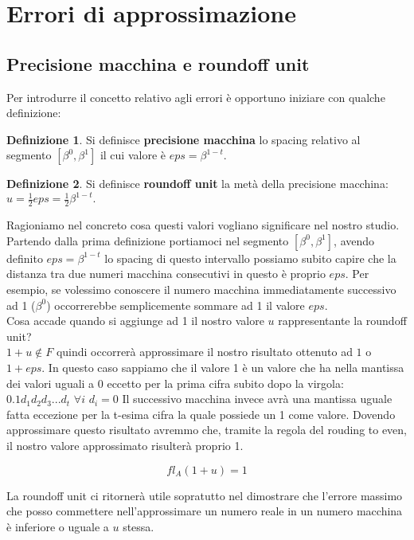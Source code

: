 \documentclass[12pt, a4paper]{book}
\theoremstyle{definition}
\newtheorem{defn}{Definizione}[section]
\begin{document}
\section{Errori di approssimazione}

\subsection{Precisione macchina e roundoff unit}
\begin{flushleft}
Per introdurre il concetto relativo agli errori è opportuno iniziare con qualche definizione:
\begin{defn}
Si definisce \textbf{precisione macchina} lo spacing relativo al segmento $[\beta^0, \beta^1]$ il cui valore è $eps = \beta^{1-t}.$
\end{defn}
\begin{defn}
Si definisce  \textbf{roundoff unit} la metà della precisione macchina: $u = \frac{1}{2}eps =  \frac{1}{2}\beta^{1-t}.$
\end{defn}

Ragioniamo nel concreto cosa questi valori vogliano significare nel nostro studio.\\
Partendo dalla prima definizione portiamoci nel segmento $[\beta^0, \beta^1]$, avendo definito $eps = \beta^{1-t}$ lo spacing di questo intervallo possiamo subito capire che la distanza tra due numeri macchina consecutivi in questo è proprio $eps$.
Per esempio,  se volessimo conoscere il numero macchina immediatamente successivo ad 1 ($\beta^{0}$) occorrerebbe semplicemente sommare ad 1 il valore $eps$. \\
Cosa accade quando si aggiunge ad 1 il nostro valore $u$ rappresentante la roundoff unit? \\
$ 1 + u \notin F$ quindi occorrerà approssimare il nostro risultato ottenuto ad $1$ o $1+eps$.  In questo caso sappiamo che il valore 1 è un valore che ha nella mantissa dei valori uguali a 0 eccetto per la prima cifra subito dopo la virgola: $0.1d_{1}d_{2}d_{3}...d_{t}$ $\forall i $ $d_{i} = 0$
Il successivo macchina invece avrà una mantissa uguale fatta eccezione per la t-esima cifra la quale possiede un 1 come valore.  Dovendo approssimare questo risultato avremmo che, tramite la regola del rouding to even, il nostro valore approssimato risulterà proprio 1. 

\[ fl_{A}(1+u) = 1  \]

La roundoff unit ci ritornerà utile sopratutto nel dimostrare che l'errore massimo che posso commettere nell'approssimare un numero reale in un numero macchina è inferiore o uguale a $u$ stessa. 
\end{flushleft}
\end{document}
